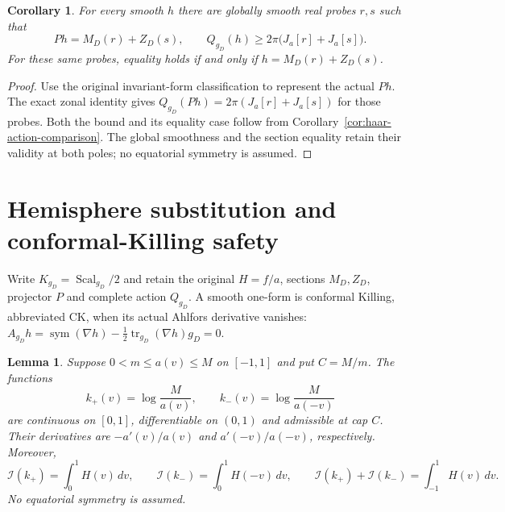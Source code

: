\documentclass[11pt]{article}
\newtheorem{lemma}[theorem]{Lemma}
\newtheorem{corollary}[theorem]{Corollary}
\newcommand{\I}{\mathcal I}
\begin{document}
\begin{corollary}\label{cor:strict-zonal-bound}
For every smooth $h$ there are globally smooth real probes $r,s$ such that
\[
 Ph=M_D(r)+Z_D(s),\qquad
 Q_{g_D}(h)\geq2\pi\bigl(J_a[r]+J_a[s]\bigr).
\]
For these same probes, equality holds if and only if
$h=M_D(r)+Z_D(s)$.
\end{corollary}

\begin{proof}
Use the original invariant-form classification to represent the actual $Ph$.
The exact zonal identity gives
$Q_{g_D}(Ph)=2\pi(J_a[r]+J_a[s])$ for those probes. Both the bound and its
equality case follow from Corollary~\ref{cor:haar-action-comparison}.
The global smoothness and the section equality retain their validity at both
poles; no equatorial symmetry is assumed.
\end{proof}

\section{Hemisphere substitution and conformal-Killing safety}

Write $K_{g_D}=\operatorname{Scal}_{g_D}/2$ and retain the original
$H=f/a$, sections $M_D,Z_D$, projector $P$ and complete action $Q_{g_D}$.
A smooth one-form is conformal Killing, abbreviated CK, when its actual
Ahlfors derivative vanishes:
$A_{g_D}h=\operatorname{sym}(\nabla h)
-\tfrac12\operatorname{tr}_{g_D}(\nabla h)g_D=0$.

\begin{lemma}\label{lem:hemisphere-pair-substitution}
Suppose $0<m\leq a(v)\leq M$ on $[-1,1]$ and put $C=M/m$. The functions
\[
 k_+(v)=\log\frac{M}{a(v)},\qquad
 k_-(v)=\log\frac{M}{a(-v)}
\]
are continuous on $[0,1]$, differentiable on $(0,1)$ and admissible at cap $C$.
Their derivatives are $-a'(v)/a(v)$ and $a'(-v)/a(-v)$, respectively.
Moreover,
\begin{equation}\label{eq:hemisphere-pair-substitution}
 \I(k_+)=\int_0^1 H(v)\,dv,\qquad
 \I(k_-)=\int_0^1 H(-v)\,dv,\qquad
 \I(k_+)+\I(k_-)=\int_{-1}^1H(v)\,dv.
\end{equation}
No equatorial symmetry is assumed.
\end{lemma}
\end{document}
